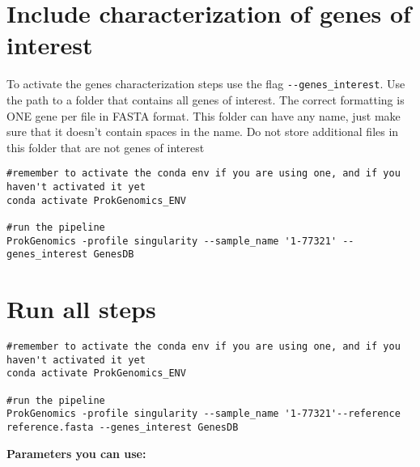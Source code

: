 \documentclass[
]{book}
\begin{document}
\hypertarget{include-characterization-of-genes-of-interest}{%
\section{Include characterization of genes of interest}\label{include-characterization-of-genes-of-interest}}

To activate the genes characterization steps use the flag \texttt{-\/-genes\_interest}. Use the path to a folder that contains all genes of interest. The correct formatting is ONE gene per file in FASTA format. This folder can have any name, just make sure that it doesn't contain spaces in the name. Do not store additional files in this folder that are not genes of interest

\begin{verbatim}
#remember to activate the conda env if you are using one, and if you haven't activated it yet
conda activate ProkGenomics_ENV

#run the pipeline
ProkGenomics -profile singularity --sample_name '1-77321' --genes_interest GenesDB 
\end{verbatim}

\hypertarget{run-all-steps}{%
\section{Run all steps}\label{run-all-steps}}

\begin{verbatim}
#remember to activate the conda env if you are using one, and if you haven't activated it yet
conda activate ProkGenomics_ENV

#run the pipeline
ProkGenomics -profile singularity --sample_name '1-77321'--reference reference.fasta --genes_interest GenesDB 
\end{verbatim}

\textbf{Parameters you can use:}
\end{document}
